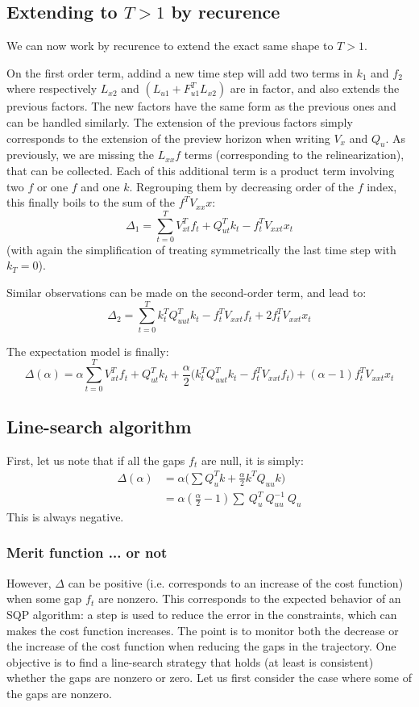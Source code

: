 \documentclass[10pt,a4paper]{article}
\begin{document}
\subsection{Extending to $T>1$ by recurence}
We can now work by recurence to extend the exact same shape to $T>1$.

On the first order term, addind a new time step will add two terms in $k_1$ and $f_2$ where respectively $L_{x2}$ and $(L_{u1} + F_{u1}^T L_{x2})$ are in factor, and also extends the previous factors.
The new factors have the same form as the previous ones and can be handled similarly.
The extension of the previous factors simply corresponds to the extension of the preview horizon when writing $V_x$ and $Q_u$.
As previously, we are missing the $L_{xx} f$ terms (corresponding to the relinearization), that can be collected.
Each of this additional term is a product term involving two $f$ or one $f$ and one $k$.
Regrouping them by decreasing order of the $f$ index, this finally boils to the sum of the $f^T V_{xx} x$:
$$\Delta_1 = \sum_{t=0}^T V_{xt}^T f_t + Q_{ut}^T k_t - f_t^T V_{xxt} x_t $$
(with again the simplification of treating symmetrically the last time step with $k_T=0$).

Similar observations can be made on the second-order term, and lead to:
$$\Delta_2 = \sum_{t=0}^T k_t^T Q_{uut}^T k_t-f_t^T V_{xxt} f_t +2 f_t^T V_{xxt} x_t $$


The expectation model is finally:
$$\Delta(\alpha) = \alpha \sum_{t=0}^T V_{xt}^T f_t + Q_{ut}^T k_t
+ \frac{\alpha}{2} \Big( k_t^T Q_{uut}^T k_t-f_t^T V_{xxt} f_t \Big)
+ (\alpha-1) f_t^T V_{xxt} x_t$$


\subsection{Line-search algorithm}

First, let us note that if all the gaps $f_t$ are null, it is simply:
\begin{align*}
  \Delta(\alpha) &= \alpha \big( \sum Q_u^T k + \frac{\alpha}{2} k^T Q_{uu} k \big) \\
  &= \alpha(\frac{\alpha}{2} - 1) \sum  \ Q_u^T\ Q_{uu}^{-1} \ Q_u
\end{align*}
This is always negative.

\subsubsection{Merit function ... or not}
However, $\Delta$ can be positive (i.e. corresponds to an increase of the cost function) when some gap $f_t$ are nonzero.
This corresponds to the expected behavior of an SQP algorithm: a step is used to reduce the error in the constraints, which can makes the cost function increases.
The point is to monitor both the decrease or the increase of the cost function when reducing the gaps in the trajectory.
One objective is to find a line-search strategy that holds (at least is consistent) whether the gaps are nonzero or zero.
Let us first consider the case where some of the gaps are nonzero.
\end{document}
